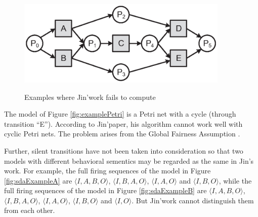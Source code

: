\documentclass[dvips,...]{llncs}
\begin{document}
\begin{figure}[htbp]
{\begin{minipage}[b]{0.45\textwidth}
		\includegraphics[width=0.9\textwidth]{fig_nfc_example_1}
	\end{minipage}
	\label{fig:nfcExampleA}
}
\caption{Examples where Jin'work fails to compute\label{fig:drawbacks}}
\end{figure}

\begin{example}\label{ex:drawback1}
The model of Figure \ref{fig:examplePetri} is a Petri net with a cycle (through transition ``E''). According to Jin'paper, his algorithm cannot work well with cyclic Petri nets. The problem arises from the Global Fairness Assumption \cite{kindler1999liveness}.
\end{example}

\begin{example}\label{ex:drawback2}
Further, silent transitions have not been taken into consideration so that two models with different behavioral sementics may be regarded as the same in Jin's work. For example, the full firing sequences of the model in Figure \ref{fig:sdaExampleA} are $\langle I,A,B,O\rangle$, $\langle I,B,A,O\rangle$, $\langle I,A,O\rangle$ and $\langle I,B,O\rangle$, while the full firing sequences of the model in Figure \ref{fig:sdaExampleB} are $\langle I,A,B,O\rangle$, $\langle I,B,A,O\rangle$, $\langle I,A,O\rangle$, $\langle I,B,O\rangle$ and $\langle I,O\rangle$. But Jin'work cannot distinguish them from each other.
\end{example}
\end{document}
